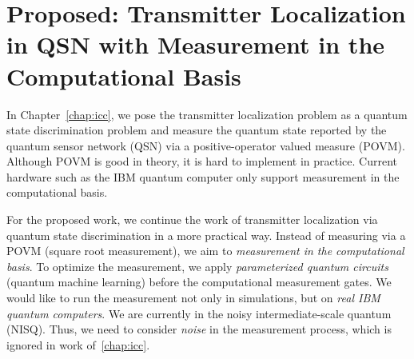 \section{Proposed: Transmitter Localization in QSN with Measurement in the Computational Basis}
In Chapter~\ref{chap:icc}, we pose the transmitter localization problem as a quantum state discrimination problem
and measure the quantum state reported by the quantum sensor network (QSN) via a positive-operator valued measure (POVM).
Although POVM is good in theory, it is hard to implement in practice.
Current hardware such as the IBM quantum computer only support measurement in the computational basis.

For the proposed work, we continue the work of transmitter localization via quantum state discrimination in a more practical way.
Instead of measuring via a POVM (square root measurement), we aim to \textit{measurement in the computational basis}.
To optimize the measurement, we apply \textit{parameterized quantum circuits} (quantum machine learning) before the computational measurement gates.
We would like to run the measurement not only in simulations, but on \textit{real IBM quantum computers}.
We are currently in the noisy intermediate-scale quantum (NISQ). 
Thus, we need to consider \textit{noise} in the measurement process, which is ignored in work of~\ref{chap:icc}.

